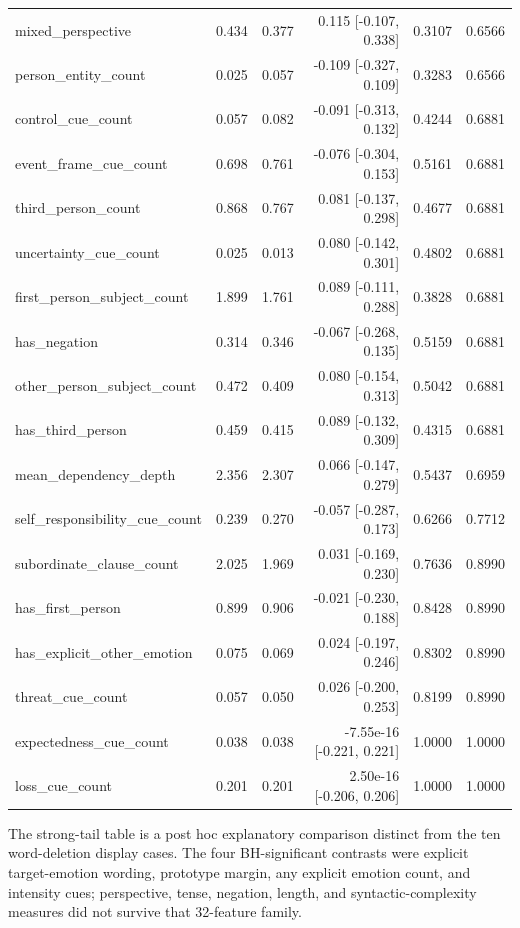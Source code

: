 \begin{table}[t]
{\begin{tabular}{lrrrrr}
mixed\_perspective & 0.434 & 0.377 & 0.115 [-0.107, 0.338] & 0.3107 & 0.6566 \\
person\_entity\_count & 0.025 & 0.057 & -0.109 [-0.327, 0.109] & 0.3283 & 0.6566 \\
control\_cue\_count & 0.057 & 0.082 & -0.091 [-0.313, 0.132] & 0.4244 & 0.6881 \\
event\_frame\_cue\_count & 0.698 & 0.761 & -0.076 [-0.304, 0.153] & 0.5161 & 0.6881 \\
third\_person\_count & 0.868 & 0.767 & 0.081 [-0.137, 0.298] & 0.4677 & 0.6881 \\
uncertainty\_cue\_count & 0.025 & 0.013 & 0.080 [-0.142, 0.301] & 0.4802 & 0.6881 \\
first\_person\_subject\_count & 1.899 & 1.761 & 0.089 [-0.111, 0.288] & 0.3828 & 0.6881 \\
has\_negation & 0.314 & 0.346 & -0.067 [-0.268, 0.135] & 0.5159 & 0.6881 \\
other\_person\_subject\_count & 0.472 & 0.409 & 0.080 [-0.154, 0.313] & 0.5042 & 0.6881 \\
has\_third\_person & 0.459 & 0.415 & 0.089 [-0.132, 0.309] & 0.4315 & 0.6881 \\
mean\_dependency\_depth & 2.356 & 2.307 & 0.066 [-0.147, 0.279] & 0.5437 & 0.6959 \\
self\_responsibility\_cue\_count & 0.239 & 0.270 & -0.057 [-0.287, 0.173] & 0.6266 & 0.7712 \\
subordinate\_clause\_count & 2.025 & 1.969 & 0.031 [-0.169, 0.230] & 0.7636 & 0.8990 \\
has\_first\_person & 0.899 & 0.906 & -0.021 [-0.230, 0.188] & 0.8428 & 0.8990 \\
has\_explicit\_other\_emotion & 0.075 & 0.069 & 0.024 [-0.197, 0.246] & 0.8302 & 0.8990 \\
threat\_cue\_count & 0.057 & 0.050 & 0.026 [-0.200, 0.253] & 0.8199 & 0.8990 \\
expectedness\_cue\_count & 0.038 & 0.038 & -7.55e-16 [-0.221, 0.221] & 1.0000 & 1.0000 \\
loss\_cue\_count & 0.201 & 0.201 & 2.50e-16 [-0.206, 0.206] & 1.0000 & 1.0000 \\
\bottomrule
\end{tabular}
}
\end{table}


The strong-tail table is a post hoc explanatory comparison distinct from the ten word-deletion display cases. The four BH-significant contrasts were explicit target-emotion wording, prototype margin, any explicit emotion count, and intensity cues; perspective, tense, negation, length, and syntactic-complexity measures did not survive that 32-feature family.

